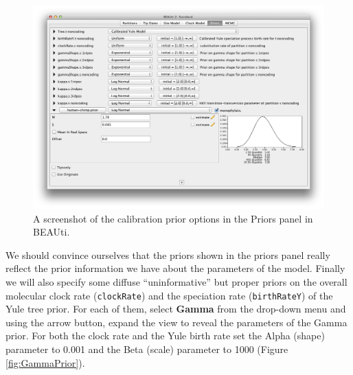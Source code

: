 \documentclass[11pt]{article}
\theoremstyle{plain}%
\theoremstyle{definition}
\theoremstyle{remark}
\begin{document}

\begin{figure}
\centering	
\includegraphics[width=\textwidth]{figures/BEAUti_Prior2}
\caption{A screenshot of the calibration prior options in the Priors panel in BEAUti.}
\label{fig:BEAUti_Prior2}
\end{figure}

We should convince ourselves that the priors shown in the priors panel really reflect the prior information we have about the parameters of the model. Finally we will also specify some diffuse ``uninformative'' but proper priors on the overall molecular clock rate (\texttt{clockRate}) and the speciation rate (\texttt{birthRateY}) of the Yule tree prior. For each of them, select \textbf{Gamma} from the drop-down menu
and using the arrow button, expand the view to reveal the parameters of the
Gamma prior. For both the clock rate and the Yule birth rate set the Alpha
(shape) parameter to 0.001 and the Beta (scale) parameter to 1000 (Figure \ref{fig:GammaPrior}).
\end{document}
